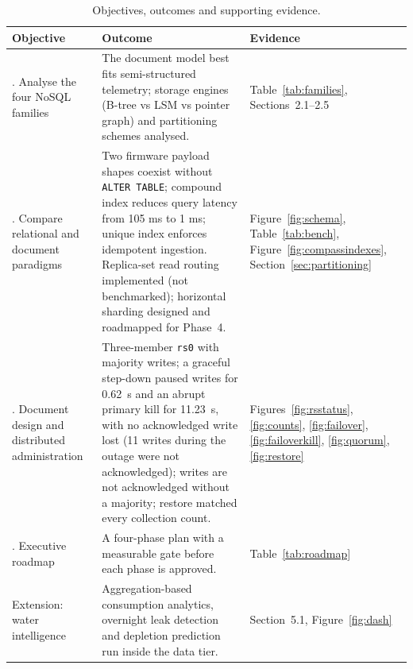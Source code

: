 \documentclass[11pt,a4paper]{article}
\begin{document}
\begin{table}[htbp]
\centering\small
\caption{Objectives, outcomes and supporting evidence.}\label{tab:objectives}
\renewcommand{\arraystretch}{1.3}
\begin{tabularx}{\textwidth}{|>{\raggedright\arraybackslash}p{3.1cm}|Y|>{\raggedright\arraybackslash}p{3.4cm}|}
\hline
\textbf{Objective} & \textbf{Outcome} & \textbf{Evidence}\\
. Analyse the four NoSQL families & The document model best fits semi-structured telemetry; storage engines (B-tree vs LSM vs pointer graph) and partitioning schemes analysed. & Table~\ref{tab:families}, Sections~2.1--2.5\\
. Compare relational and document paradigms & Two firmware payload shapes coexist without \texttt{ALTER TABLE}; compound index reduces query latency from 105 ms to 1 ms; unique index enforces idempotent ingestion. Replica-set read routing implemented (not benchmarked); horizontal sharding designed and roadmapped for Phase~4. & Figure~\ref{fig:schema}, Table~\ref{tab:bench}, Figure~\ref{fig:compassindexes}, Section~\ref{sec:partitioning}\\
. Document design and distributed administration & Three-member \texttt{rs0} with majority writes; a graceful step-down paused writes for 0.62~s and an abrupt primary kill for 11.23~s, with no acknowledged write lost (11 writes during the outage were not acknowledged); writes are not acknowledged without a majority; restore matched every collection count. & Figures~\ref{fig:rsstatus}, \ref{fig:counts}, \ref{fig:failover}, \ref{fig:failoverkill}, \ref{fig:quorum}, \ref{fig:restore}\\
. Executive roadmap & A four-phase plan with a measurable gate before each phase is approved. & Table~\ref{tab:roadmap}\\
\hline
Extension: water intelligence & Aggregation-based consumption analytics, overnight leak detection and depletion prediction run inside the data tier. & Section~5.1, Figure~\ref{fig:dash}\\
\hline
\end{tabularx}
\end{table}
\end{document}
